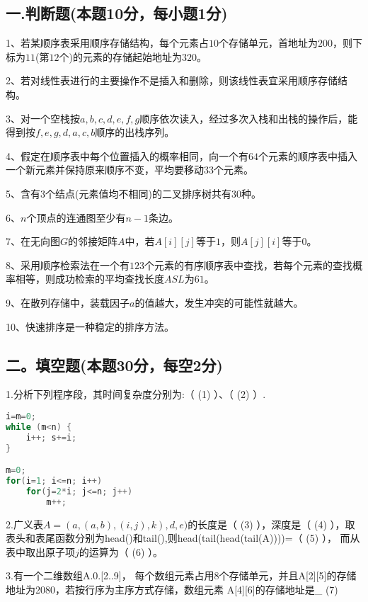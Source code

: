 
\subsection{一.判断题(本题10分，每小题1分)}

1、若某顺序表采用顺序存储结构，每个元素占$10$个存储单元，首地址为$200$，则下标为$11$(第$12$个)的元素的存储起始地址为$320$。

2、若对线性表进行的主要操作不是插入和删除，则该线性表宜采用顺序存储结构。

3、对一个空栈按$a,b,c,d,e,f,g$顺序依次读入，经过多次入栈和出栈的操作后，能得到按$f,e,g,d,a,c,b$顺序的出栈序列。

4、假定在顺序表中每个位置插入的概率相同，向一个有$64$个元素的顺序表中插入一个新元素并保持原来顺序不变，平均要移动$33$个元素。

5、含有$3$个结点(元素值均不相同)的二叉排序树共有$30$种。

6、$n$个顶点的连通图至少有$n-1$条边。

7、在无向图$G$的邻接矩阵$A$中，若$A[i][j]$等于$1$，则$A[j][i]$等于$0$。

8、采用顺序检索法在一个有$123$个元素的有序顺序表中查找，若每个元素的查找概率相等，则成功检索的平均查找长度$ASL$为$61$。

9、在散列存储中，装载因子$a$的值越大，发生冲突的可能性就越大。

10、快速排序是一种稳定的排序方法。

\subsection{二。填空题(本题30分，每空2分)}

1.分析下列程序段，其时间复杂度分别为:（ (1) ）、（ (2) ）.
\begin{lstlisting}[language=cpp]
i=m=0;
while (m<n) {
    i++; s+=i;
}

m=0;
for(i=1; i<=n; i++)
    for(j=2*i; j<=n; j++)
        m++;
\end{lstlisting}

2.广义表$A=(a, (a, b), (i,j),k),d,e)$的长度是（ (3) ），深度是（ (4) ），取表头和表尾函数分别为head()和tail(),则head(tail(head(tail(A))))=（ (5) ）， 而从表中取出原子项$j$的运算为（ (6) ）。

3.有一个二维数组A.0.[2..9]， 每个数组元素占用8个存储单元，并且A[2][5]的存储地址为2080，若按行序为主序方式存储，数组元素 A[4][6]的存储地址是\_ (7)

